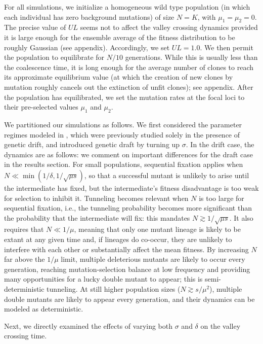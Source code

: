 \documentclass[10pt,twocolumn,twoside]{gsajnl}
\begin{document}
\begin{spacing}{1.5}
For all simulations, we initialize a homogeneous wild type population (in which each individual has zero background mutations) of size $N = K$, with $\mu_1 = \mu_2 = 0$.
The precise value of $UL$ seems not to affect the valley crossing dynamics provided it is large enough for the ensemble average of the fitness distribution to be roughly Gaussian (see appendix).
Accordingly, we set $UL = 1.0$.
We then permit the population to equilibrate for $N/10$ generations.
While this is usually less than the coalescence time, it is long enough for the average number of clones to reach its approximate equilibrium value (at which the creation of new clones by mutation roughly cancels out the extinction of unfit clones); see appendix.
After the population has equilibrated, we set the mutation rates at the focal loci to their pre-selected values $\mu_1$ and $\mu_2$.

We partitioned our simulations as follows.
We first considered the parameter regimes modeled in \citet{weissman_2009}, which were previously studied solely in the presence of genetic drift, and introduced genetic draft by turning up $\sigma$.
In the drift case, the dynamics are as follows: we comment on important differences for the draft case in the results section.
For small populations, sequential fixation applies when $N \ll \min(1/\delta, 1/\sqrt{\mu s})$, so that a successful mutant is unlikely to arise until the intermediate has fixed, but the intermediate's fitness disadvantage is too weak for selection to inhibit it.
Tunneling becomes relevant when $N$ is too large for sequential fixation, i.e., the tunneling probability becomes more significant than the probability that the intermediate will fix: this mandates $N \gtrsim 1/\sqrt{\mu s}$.
It also requires that $N \ll 1/\mu$, meaning that only one mutant lineage is likely to be extant at any given time and, if lineages do co-occur, they are unlikely to interfere with each other or substantially affect the mean fitness.
By increasing $N$ far above the $1/\mu$ limit, multiple deleterious mutants are likely to occur every generation, reaching mutation-selection balance at low frequency and providing many opportunities for a lucky double mutant to appear; this is semi-deterministic tunneling.
At still higher population sizes ($N \gtrsim s/\mu^2$), multiple double mutants are likely to appear every generation, and their dynamics can be modeled as deterministic.

Next, we directly examined the effects of varying both $\sigma$ and $\delta$ on the valley crossing time.


\end{spacing}
\end{document}
